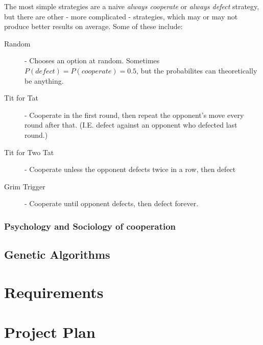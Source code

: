 \documentclass{article}
\begin{document}
The most simple strategies are a naive \emph{always cooperate} or \emph{always defect} strategy, but there are other - more complicated - strategies, which may or may not produce better results on average. Some of these include:
\begin{description}
	\item[Random] - Chooses an option at random. Sometimes $P(defect) = P(cooperate) = 0.5$, but the probabilites can theoretically be anything.
	\item[Tit for Tat] - Cooperate in the first round, then repeat the opponent's move every round after that. (I.E. defect against an opponent who defected last round.)
	\item[Tit for Two Tat] - Cooperate unless the opponent defects twice in a row, then defect
	\item[Grim Trigger] - Cooperate until opponent defects, then defect forever.
\end{description}

\subsubsection{Psychology and Sociology of cooperation}
\label{sec:psychology-sociology-cooperation}

\subsection{Genetic Algorithms}
\label{sec:genetic-algorithms}

\section{Requirements}
\label{sec:requirements}

\section{Project Plan}
\label{sec:project-plan}
\end{document}
